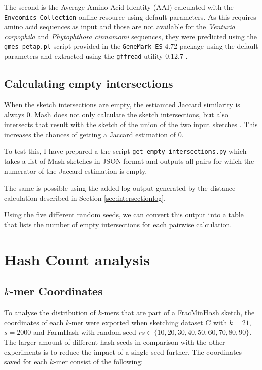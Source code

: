 The second is the Average Amino Acid Identity (AAI) calculated with the
\texttt{Enveomics Collection} online resource
\cite{rodriguez-rEnveomicsCollectionToolbox2016} using default parameters. As
this requires amino acid sequences as input and those are not available for the
\textit{Venturia carpophila} and \textit{Phytophthora cinnamomi} sequences, they
were predicted using the \texttt{gmes\_petap.pl} script provided in the
\texttt{GeneMark ES} 4.72 package \cite{lomsadzeGeneIdentificationNovel2005}
using the default parameters and extracted using the \texttt{gffread} utility
0.12.7 \cite{perteaGFFUtilitiesGffRead2020}.


\subsection*{Calculating empty intersections}
When the sketch intersections are empty, the estiamted Jaccard similarity is
always 0. Mash does not only calculate the sketch intersections, but also
intersects that result with the sketch of the union of the two input sketches
\cite{ondovMashFastGenome2016}. This increases the chances of getting a Jaccard
estimation of 0. 

To test this, I have prepared a the script \texttt{get\_empty\_intersections.py}
which takes a list of Mash sketches in JSON format and outputs all pairs for
which the numerator of the Jaccard estimation is empty.

The same is possible using the added log output generated by the distance
calculation described in Section \ref{sec:intersectionlog}.

Using the five different random seeds, we can convert this output into a table
that lists the number of empty intersections for each pairwise calculation.



\section{Hash Count analysis}
\subsection*{$k$-mer Coordinates}
To analyse the distribution of $k$-mers that are part of a FracMinHash sketch,
the coordinates of each $k$-mer were exported when sketching dataset C with
$k=21$, $s=2000$ and FarmHash with random seed $rs \in \{10, 20, 30, 40, 50, 60,
70, 80, 90\}$. The larger amount of different hash seeds in comparison with the
other experiments is to reduce the impact of a single seed further. 
The coordinates saved for each $k$-mer consist of the following:


